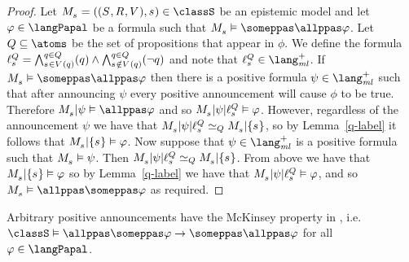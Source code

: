\begin{proof}
Let $\kPModelAndTuple{\kStateS} \in \classS$ be an epistemic model and 
let $\phi \in \langPapal$ be a formula such that $\kPModel{\kStateS} \entails \someppas \allppas \phi$.
Let $\atomsQ \subseteq \atoms$ be the set of propositions that appear in $\phi$.
We define the formula $\ell^{\atomsQ}_{\kStateS} = \bigwedge^{\atomQ \in \atomsQ}_{\kStateS \in \kValuation(\atomQ)} (\atomQ) \land \bigwedge^{\atomQ \in \atomsQ}_{\kStateS \notin \kValuation(\atomQ)} (\neg \atomQ)$ and note that $\ell^{\atomsQ}_{\kStateS} \in \langMlPlus$.
If $\kPModel{\kStateS} \entails \someppas \allppas \phi$ then there is a positive formula $\psi \in \langMlPlus$ such that after announcing $\psi$ every positive announcement will cause $\phi$ to be true.
Therefore $\restrict{\kPModel{\kStateS}}{\psi} \entails \allppas \phi$ and so $\restrict{\restrict{\kPModel{\kStateS}}{\psi}}{\ell^{\atomsQ}_{\kStateS}} \entails \phi$.
However, regardless of the announcement $\psi$ we have that $\restrict{\restrict{\kPModel{\kStateS}}{\psi}}{\ell^{\atomsQ}_{\kStateS}} \bisimilar[\atomsQ] \restrict{\kPModel{\kStateS}}{\{\kStateS\}}$, so by Lemma~\ref{q-label} it follows that $\restrict{\kPModel{\kStateS}}{\{\kStateS\}} \entails \phi$.
Now suppose that $\psi \in \langMlPlus$ is a positive formula such that $\kPModel{\kStateS} \entails \psi$.
Then $\restrict{\restrict{\kPModel{\kStateS}}{\psi}}{\ell^{\atomsQ}_{\kStateS}} \bisimilar[\atomsQ] \restrict{\kPModel{\kStateS}}{\{\kStateS\}}$.
From above we have that $\restrict{\kPModel{\kStateS}}{\{\kStateS\}} \entails \phi$ so by Lemma~\ref{q-label} we have that $\restrict{\restrict{\kPModel{\kStateS}}{\psi}}{\ell^{\atomsQ}_{\kStateS}} \entails \phi$, and so $\kPModel{\kStateS} \entails \allppas \someppas \phi$ as required.
\end{proof}

\begin{proposition}
Arbitrary positive announcements have the McKinsey property in \classS{}, i.e. $\classS \entails \allppas \someppas \phi \implies \someppas \allppas \phi$ for all $\phi \in \langPapal$.
\end{proposition}

